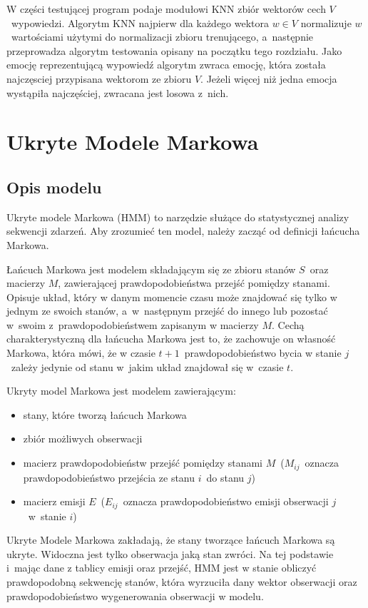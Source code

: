 \documentclass[declaration,shortabstract]{iithesis}
\begin{document}
W części testującej program podaje modułowi KNN zbiór wektorów cech $V$~wypowiedzi. Algorytm KNN najpierw dla każdego wektora $w \in V$ normalizuje $w$~wartościami użytymi do normalizacji zbioru trenującego, a~następnie przeprowadza algorytm testowania opisany na początku tego rozdziału. Jako emocję reprezentującą wypowiedź algorytm zwraca emocję, która została najczęsciej przypisana wektorom ze zbioru $V$. Jeżeli więcej niż jedna emocja wystąpiła najczęściej, zwracana jest losowa z~nich.  

\chapter{Ukryte Modele Markowa}
\section{Opis modelu}
Ukryte modele Markowa (HMM) to narzędzie służące do statystycznej analizy sekwencji zdarzeń. Aby zrozumieć ten model, należy zacząć od 
definicji łańcucha Markowa.

Łańcuch Markowa jest modelem składającym się ze zbioru stanów $S$~oraz macierzy $M$, zawierającej prawdopodobieństwa przejść pomiędzy stanami. Opisuje układ, który w danym momencie czasu może znajdować się tylko w jednym ze swoich stanów, a~w~następnym przejść do innego lub pozostać w~swoim z~prawdopodobieństwem zapisanym w macierzy $M$. Cechą charakterystyczną dla łańcucha Markowa jest to, że zachowuje on własność Markowa, która mówi, że w czasie $t+1$~prawdopodobieństwo bycia w stanie $j$~zależy jedynie od stanu w~jakim układ znajdował się w~czasie $t$.

Ukryty model Markowa jest modelem zawierającym:
\begin{itemize}
\item stany, które tworzą łańcuch Markowa
\item zbiór możliwych obserwacji
\item macierz prawdopodobieństw przejść pomiędzy stanami $M$~($M_{ij}$~oznacza prawdopodobieństwo przejścia ze stanu $i$~do stanu $j$)
\item macierz emisji $E$~($E_{ij}$~oznacza prawdopodobieństwo emisji obserwacji $j$~w~stanie $i$)
\end{itemize}

Ukryte Modele Markowa zakładają, że stany tworzące łańcuch Markowa są ukryte. Widoczna jest tylko obserwacja jaką stan zwróci. Na tej podstawie i~mając dane z tablicy emisji oraz przejść, HMM jest w stanie obliczyć prawdopodobną sekwencję stanów, która wyrzuciła dany wektor obserwacji oraz prawdopodobieństwo wygenerowania obserwacji w modelu.
\end{document}
